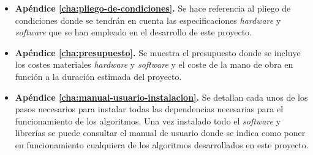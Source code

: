 \begin{itemize}
    \item \textbf{Apéndice \ref{cha:pliego-de-condiciones}.} Se hace referencia al pliego de condiciones donde se tendrán en cuenta las especificaciones \textit{hardware} y \textit{software} que se han empleado en el desarrollo de este proyecto.
    \item \textbf{Apéndice \ref{cha:presupuesto}.} Se muestra el presupuesto donde se incluye los costes materiales \textit{hardware} y \textit{software} y el coste de la mano de obra en función a la duración estimada del proyecto.
    \item \textbf{Apéndice \ref{cha:manual-usuario-instalacion}.} Se detallan cada unos de los pasos necesarios para instalar todas las dependencias necesarias para el funcionamiento de los algoritmos. Una vez instalado todo el \textit{software} y librerías se puede consultar el manual de usuario donde se indica como poner en funcionamiento cualquiera de los algoritmos desarrollados en este proyecto.
\end{itemize}





